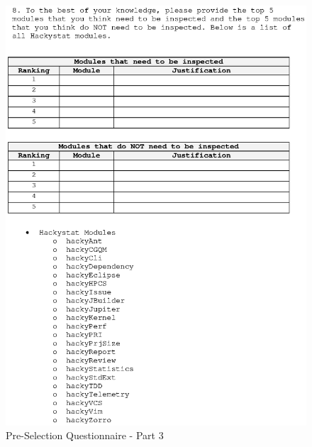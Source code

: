 \begin{figure}[htbp]
  \centering
  \includegraphics[width=1.0\textwidth]{figs/Questionnaire-Pre-shrunk_3.eps}
  \caption{Pre-Selection Questionnaire - Part 3}
  \label{fig:questionnaire-pre3}
\end{figure}

